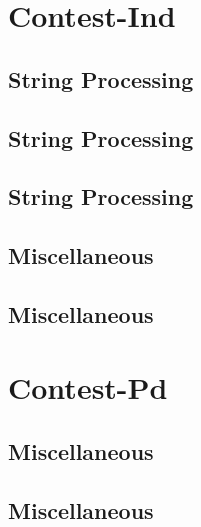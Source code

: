 \section{Contest-Ind}
\subsection{String Processing}
\raggedbottom
\vspace{-.7\baselineskip}\hrulefill
\vspace{0.1\baselineskip}\subsection{String Processing}
\raggedbottom
\vspace{-.7\baselineskip}\hrulefill
\vspace{0.1\baselineskip}\subsection{String Processing}
\raggedbottom
\vspace{-.7\baselineskip}\hrulefill
\vspace{0.1\baselineskip}\subsection{Miscellaneous}
\raggedbottom
\vspace{-.7\baselineskip}\hrulefill
\vspace{0.1\baselineskip}\subsection{Miscellaneous}
\raggedbottom
\vspace{-.7\baselineskip}\hrulefill
\vspace{0.1\baselineskip}
\section{Contest-Pd}
\subsection{Miscellaneous}
\raggedbottom
\vspace{-.7\baselineskip}\hrulefill
\vspace{0.1\baselineskip}\subsection{Miscellaneous}
\raggedbottom
\vspace{-.7\baselineskip}\hrulefill
\vspace{0.1\baselineskip}

